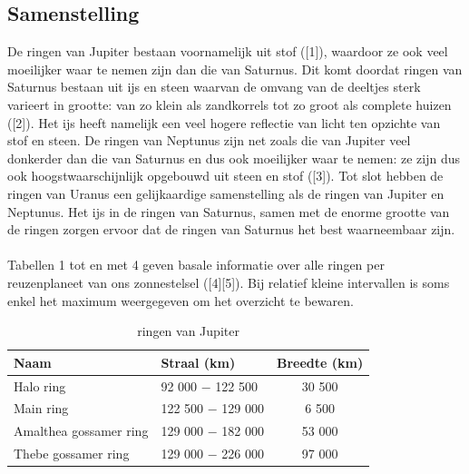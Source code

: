 \documentclass[a4paper]{article}
\begin{document}
	\subsection{Samenstelling}
	De ringen van Jupiter bestaan voornamelijk uit stof ([1]), waardoor ze ook veel moeilijker waar te nemen zijn dan die van Saturnus.
	Dit komt doordat ringen van Saturnus bestaan uit ijs en steen waarvan de omvang van de deeltjes sterk varieert in grootte: van zo klein als zandkorrels tot zo groot als complete huizen ([2]).
	Het ijs heeft namelijk een veel hogere reflectie van licht ten opzichte van stof en steen.
	De ringen van Neptunus zijn net zoals die van Jupiter veel donkerder dan die van Saturnus en dus ook moeilijker waar te nemen: ze zijn dus ook hoogstwaarschijnlijk opgebouwd uit steen en stof ([3]).
	Tot slot hebben de ringen van Uranus een gelijkaardige samenstelling als de ringen van Jupiter en Neptunus. Het ijs in de ringen van Saturnus, samen met de enorme grootte van de ringen zorgen ervoor dat
	de ringen van Saturnus het best waarneembaar zijn.\\
	\\
	Tabellen 1 tot en met 4 geven basale informatie over alle ringen per reuzenplaneet van ons zonnestelsel ([4][5]).
	Bij relatief kleine intervallen is soms enkel het maximum weergegeven om het overzicht te bewaren.
	 		 \begin{table}[h]
	 		 	\caption{ringen van Jupiter}
	 		 	\centering
	 		 	\begin{tabular}{l|lc|}
	 		 		\hline
	 		 		\multicolumn{1}{|l|}{\textbf{Naam}}          & \multicolumn{1}{l}{\textbf{Straal (km)}} & \multicolumn{1}{l|}{\textbf{Breedte (km)}} \\ \hline
	 		 		\multicolumn{1}{|l|}{Halo ring}              & 92 000 $-$ 122 500                           & 30 500                                      \\
	 		 		\multicolumn{1}{|l|}{Main ring}              & 122 500 $-$ 129 000                          & 6 500                                       \\
	 		 		\multicolumn{1}{|l|}{Amalthea gossamer ring} & 129 000 $-$ 182 000                          & 53 000                                      \\ 
	 		 		\multicolumn{1}{|l|}{Thebe gossamer ring}    & 129 000 $-$ 226 000                          & 97 000                                      \\ \hline
	 		 	\end{tabular}
	 		 \end{table}
\end{document}
